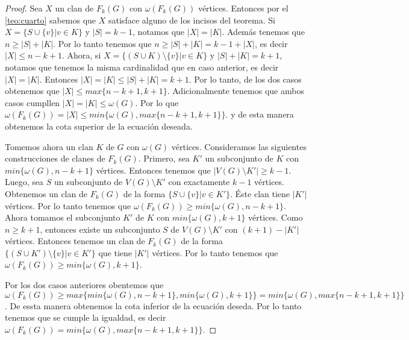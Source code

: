     \begin{proof}
        Sea $X$ un clan de $F_k(G)$ con $\omega(F_k(G))$ v\'ertices. Entonces
        por el \cref{teo:cuarto} sabemos que $X$ satisface alguno de los incisos
        del teorema. Si $X = \{S \cup \{v\}| v \in K\}$ y $|S| = k-1$, notamos
        que $|X| = |K|$. Adem\'as tenemos que $n \geq |S| + |K|$. Por lo tanto
        tenemos que $n \geq |S| + |K| = k-1 + |X|$, es decir $|X| \leq n-k+1$.
        Ahora, si $X = \{(S\cup K) \setminus \{v\}| v \in K \}$ y $|S| + |K| =
        k+1$, notamos que tenemos la misma cardinalidad que en caso anterior, es
        decir $|X| =|K|$. Entonces $|X| = |K| \leq |S| + |K| = k+1$. Por lo
        tanto, de los dos casos obtenemos que $|X| \leq max\{n-k+1, k+1\}$.
        Adicionalmente tenemos que ambos casos cumpllen $|X| = |K| \leq
        \omega(G)$. Por lo que $\omega(F_k(G)) = |X| \leq min \{\omega(G), max
        \{n-k+1, k+1\}\}$. y de esta manera obtenemos la cota superior de la
        ecuaci\'on deseada.

        Tomemos ahora un clan $K$ de $G$ con $\omega(G)$ v\'ertices.
        Consideramos las siguientes construcciones de clanes de $F_k(G)$.
        Primero, sea $K'$ un subconjunto de $K$ con $min\{\omega(G),n-k+1\}$
        v\'ertices. Entonces tenemos que $|V(G) \setminus K'| \geq k-1$. Luego,
        sea $S$ un subconjunto de $V(G) \setminus K'$ con exactamente $k-1$
        v\'ertices. Obtenemos un clan de $F_k(G)$ de la forma $\{ S \cup \{v\}|v
        \in K'\}$. \'Este clan tiene $|K'|$ v\'ertices. Por lo tanto tenemos que
        $\omega(F_k(G)) \geq min \{\omega(G), n-k+1\}$. Ahora tomamos el
        subconjunto $K'$ de $K$ con $min \{ \omega(G), k+1\}$ v\'ertices. Como
        $n \geq k+1$, entonces existe un subconjunto $S$ de $V(G) \setminus K'$
        con $(k+1)-|K'|$ v\'ertices. Entonces tenemos un clan de $F_k(G)$ de la
        forma $\{ (S \cup K') \setminus \{v\}|v \in K'\}$ que tiene $|K'|$
        v\'ertices. Por lo tanto tenemos que $\omega(F_k(G)) \geq min
        \{\omega(G), k+1\}$.

        Por los dos casos anteriores obentemos que $\omega(F_k(G)) \geq max
        \{min \{\omega(G), n-k+1\}, min \{\omega(G), k+1 \}\} = min \{\omega(G),
        max \{n-k+1,k+1\}\}$. De essta manera obtenemos la cota inferior de la
        ecuaci\'on deseda. Por lo tanto tenemos que se cumple la igualdad, es
        decir  $\omega(F_k(G))= min \{\omega(G), max \{n-k+1,k+1\}\}$.
    \end{proof}

